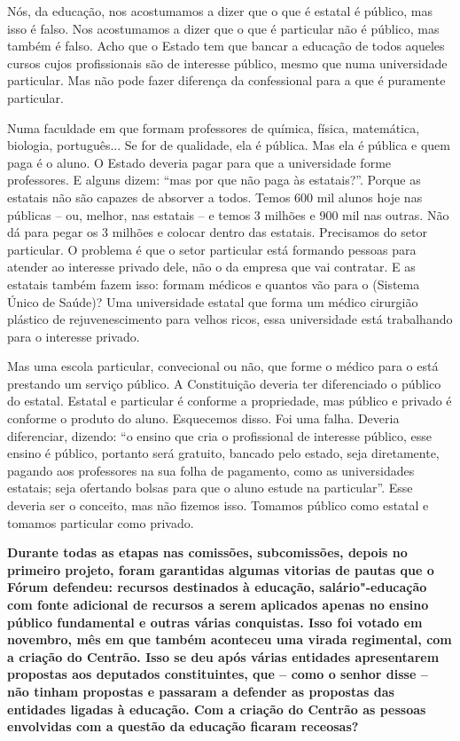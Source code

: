 Nós, da educação, nos acostumamos a dizer que o que é estatal é público,
mas isso é falso. Nos acostumamos a dizer que o que é particular não é
público, mas também é falso. Acho que o Estado tem que bancar a educação
de todos aqueles cursos cujos profissionais são de interesse público,
mesmo que numa universidade particular. Mas não pode fazer diferença da
confessional para a que é puramente particular.

Numa faculdade em que formam professores de química, física, matemática,
biologia, português... Se for de qualidade, ela é pública. Mas ela é
pública e quem paga é o aluno. O Estado deveria pagar para que a
universidade forme professores. E alguns dizem: ``mas por que não paga
às estatais?''. Porque as estatais não são capazes de absorver a todos.
Temos 600 mil alunos hoje nas públicas -- ou, melhor, nas estatais -- e
temos 3 milhões e 900 mil nas outras. Não dá para pegar os 3 milhões e
colocar dentro das estatais. Precisamos do setor particular. O problema
é que o setor particular está formando pessoas para atender ao interesse
privado dele, não o da empresa que vai contratar. E as estatais também
fazem isso: formam médicos e quantos vão para o  (Sistema Único de
Saúde)? Uma universidade estatal que forma um médico cirurgião plástico
de rejuvenescimento para velhos ricos, essa universidade está
trabalhando para o interesse privado.

Mas uma escola particular, convecional ou não, que forme o médico para o
 está prestando um serviço público. A Constituição deveria ter
diferenciado o público do estatal. Estatal e particular é conforme a
propriedade, mas público e privado é conforme o produto do aluno.
Esquecemos disso. Foi uma falha. Deveria diferenciar, dizendo: ``o
ensino que cria o profissional de interesse público, esse ensino é
público, portanto será gratuito, bancado pelo estado, seja diretamente,
pagando aos professores na sua folha de pagamento, como as universidades
estatais; seja ofertando bolsas para que o aluno estude na particular''.
Esse deveria ser o conceito, mas não fizemos isso. Tomamos público como
estatal e tomamos particular como privado.

\textbf{Durante todas as etapas nas comissões, subcomissões, depois no
primeiro projeto, foram garantidas algumas vitorias de pautas que o
Fórum defendeu: recursos destinados à educação, salário"-educação com
fonte adicional de recursos a serem aplicados apenas no ensino público
fundamental e outras várias conquistas. Isso foi votado em novembro, mês
em que também aconteceu uma virada regimental, com a criação do Centrão.
Isso se deu após várias entidades apresentarem propostas aos deputados
constituintes, que -- como o senhor disse -- não tinham propostas e
passaram a defender as propostas das entidades ligadas à educação. Com a
criação do Centrão as pessoas envolvidas com a questão da educação
ficaram receosas?}

